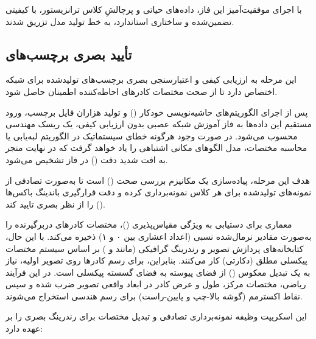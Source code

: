 \documentclass{article}
\begin{document}
با اجرای موفقیت‌آمیز این فاز، داده‌های حیاتی و پرچالشِ کلاس ترانزیستور، با کیفیتی تضمین‌شده و ساختاری استاندارد، به خط تولید مدل  تزریق شدند.

\subsection{تأیید بصری برچسب‌های }

این مرحله به ارزیابی کیفی و اعتبارسنجی بصری برچسب‌های تولیدشده برای شبکه  اختصاص دارد تا از صحت مختصات کادرهای احاطه‌کننده اطمینان حاصل شود.

 پس از اجرای الگوریتم‌های حاشیه‌نویسی خودکار () و تولید هزاران فایل برچسب، ورود مستقیم این داده‌ها به فاز آموزش شبکه عصبی بدون ارزیابی کیفی، یک ریسک مهندسی محسوب می‌شود. در صورت وجود هرگونه خطای سیستماتیک در الگوریتم لبه‌یابی یا محاسبه مختصات، مدل  الگوهای مکانی اشتباهی را یاد خواهد گرفت که در نهایت منجر به افت شدید دقت () در فاز تشخیص می‌شود.

هدف این مرحله، پیاده‌سازی یک مکانیزم بررسی صحت () است تا به‌صورت تصادفی از نمونه‌های تولیدشده برای هر کلاس نمونه‌برداری کرده و دقت قرارگیری باندینگ باکس‌ها () را از نظر بصری تایید کند.

معماری  برای دستیابی به ویژگی مقیاس‌پذیری ()، مختصات کادرهای دربرگیرنده را به‌صورت مقادیر نرمال‌شده نسبی (اعداد اعشاری بین ۰ و ۱) ذخیره می‌کند. با این حال، کتابخانه‌های پردازش تصویر و رندرینگ گرافیکی (مانند  و ) بر اساس سیستم مختصات پیکسلی مطلق (دکارتی) کار می‌کنند. بنابراین، برای رسم کادرها روی تصویر اولیه، نیاز به یک تبدیل معکوس () از فضای پیوسته  به فضای گسسته پیکسلی است. در این فرآیند ریاضی، مختصات مرکز، طول و عرض کادر در ابعاد واقعی تصویر ضرب شده و سپس نقاط اکسترمم (گوشه بالا-چپ و پایین-راست) برای رسم هندسی استخراج می‌شوند.


این اسکریپت وظیفه نمونه‌برداری تصادفی و تبدیل مختصات برای رندرینگ بصری را بر عهده دارد:
\end{document}
